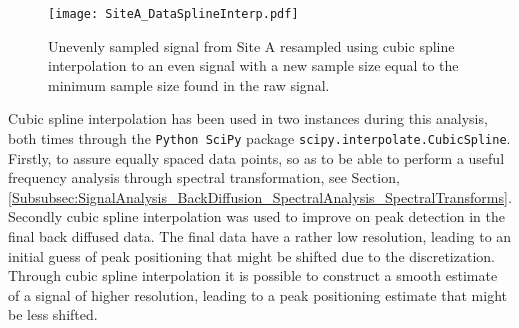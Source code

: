 \documentclass[../../CompleteThesis2/Complete_2ndDraft]{subfiles}
\begin{document}
\begin{figure}[h]
	\centering
	\texttt{[image: SiteA\_DataSplineInterp.pdf]}
	\caption[Even resampling of unevenly sampled data, Site A]{\small Unevenly sampled signal from Site A resampled using cubic spline interpolation to an even signal with a new sample size equal to the minimum sample size found in the raw signal.}
	\label{Fig:COMPMETH_SiteA_DataSplineInterp}
\end{figure}

Cubic spline interpolation has been used in two instances during this analysis, both times through the \lstinline[language=Python]|Python SciPy| package \lstinline[language=Python]|scipy.interpolate.CubicSpline|. Firstly, to assure equally spaced data points, so as to be able to perform a useful frequency analysis through spectral transformation, see Section, \ref{Subsubsec:SignalAnalysis_BackDiffusion_SpectralAnalysis_SpectralTransforms}. Secondly cubic spline interpolation was used to improve on peak detection in the final back diffused data. The final data have a rather low resolution, leading to an initial guess of peak positioning that might be shifted due to the discretization. Through cubic spline interpolation it is possible to construct a smooth estimate of a signal of higher resolution, leading to a peak positioning estimate that might be less shifted.
\end{document}

